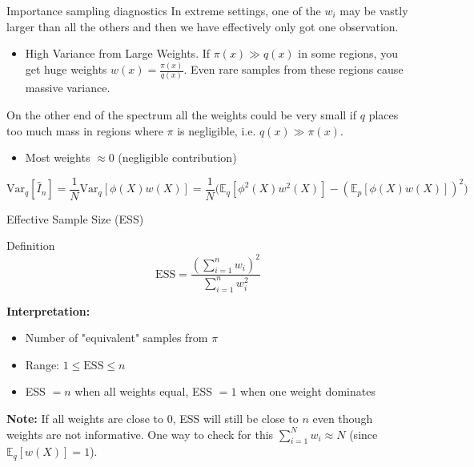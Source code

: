 \begin{frame}{Importance sampling diagnostics}
	In extreme settings, one of the $w_i$ may be vastly larger than all the others and
	then we have effectively only got one observation.
	
	\vspace{0.3cm}
	\begin{itemize}
		\item High Variance from Large Weights. If $\pi(x)\gg q(x)$ in some regions, you get huge weights $w(x) = \frac{\pi(x)}{q(x)}$. Even rare samples from these regions cause massive variance.
	\end{itemize}

	On the other end of the spectrum all the weights could be very small if $q$ places too much 
	mass in regions where $\pi$ is negligible, i.e. $q(x) \gg \pi(x)$.

	\vspace{0.3cm}
	\begin{itemize}
		\item Most weights $ \approx 0$ (negligible contribution)
	\end{itemize}

	$$\text{Var}_q[\hat{I}_n] = \frac{1}{N} \text{Var}_q[\phi(X) w(X)] = \frac{1}{N} \Big(\mathbb{E}_q[\phi^2(X) w^2(X)] - (\mathbb{E}_p[\phi(X) w(X)])^2\Big)$$
\end{frame}

\begin{frame}{Effective Sample Size (ESS)}
	\begin{block}{Definition}
		$$\text{ESS} = \frac{(\sum_{i=1}^n w_i)^2}{\sum_{i=1}^n w_i^2}$$
	\end{block}

	\textbf{Interpretation:}
	\begin{itemize}
		\item Number of "equivalent" samples from $\pi$
		\item Range: $1 \leq \text{ESS} \leq n$
		\item ESS $= n$ when all weights equal, ESS $= 1$ when one weight dominates
	\end{itemize}

	\textbf{Note:}
	If all weights are close to 0, ESS will still be close to $n$ even though weights are not informative.
	One way to check for this $\sum_{i=1}^N w_i \approx N$ (since $\mathbb{E}_q[w(X)] = 1$).
\end{frame}

